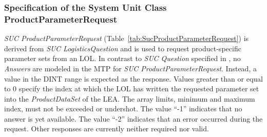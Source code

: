 \subsubsection{Specification of the System Unit Class ProductParameterRequest}

\emph{SUC ProductParameterRequest} (Table~\ref{tab:SucProductParameterRequest}) is derived from \emph{SUC LogisticsQuestion} and is used to request product-specific parameter sets from an LOL. In contrast to \emph{SUC Question} specified in \cite{PNO.2025.Part4}, no \emph{Answers} are modeled in the MTP for \emph{SUC ProductParameterRequest}. Instead, a value in the DINT range is expected as the response. Values greater than or equal to 0 specify the index at which the LOL has written the requested parameter set into the \emph{ProductDataSet} of the LEA. The array limits, minimum and maximum index, must not be exceeded or undershot. The value \enquote{-1} indicates that no answer is yet available. The value \enquote{-2} indicates that an error occurred during the request. Other responses are currently neither required nor valid.

